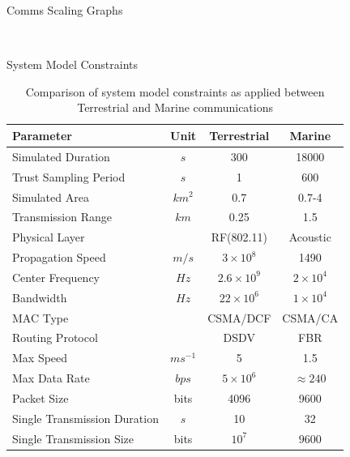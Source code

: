 \documentclass{beamer}
\begin{document}
\begin{frame}[allowframebreaks]{Comms Scaling Graphs}

\setcounter{subfigure}{0}%
  \begin{figure}[h]
    \centering
    \\
    \label{fig:CommsThroughputRatios}
  \end{figure}

\end{frame}

\begin{frame}[shrink]{System Model Constraints}
\centering
\begin{table}[h]
  \caption{Comparison of system model constraints as applied between Terrestrial and Marine communications} \label{tab:sysconstraints}
  \begin{center}
    \setlength{\tabcolsep}{8pt}
    \begin{tabular}{lccc}
      \toprule
      Parameter & Unit & Terrestrial & Marine \\
      \midrule
      Simulated Duration & $s$ & 300 & 18000\\
      Trust Sampling Period & $s$ & 1 & 600 \\
      Simulated Area & $km^2$ & 0.7 & 0.7-4 \\
      Transmission Range & $km$ & 0.25 & 1.5 \\
      Physical Layer & & RF(802.11) & Acoustic\\
      Propagation Speed& $m/s$ & $3\times10^8$ & 1490\\
      Center Frequency& $Hz$ & $2.6\times10^9$ & $2 \times 10^4$ \\
      Bandwidth& $Hz$ & $22\times10^6$ & $1\times10^4$\\
      MAC Type & & CSMA/DCF & CSMA/CA\\
      Routing Protocol & & DSDV & FBR \\
      Max Speed & $ms^{-1}$ & 5 & 1.5 \\
      Max Data Rate & $bps$ & $5\times10^6$ & $\approx 240$ \\
      Packet Size & bits & 4096 &  9600 \\
      Single Transmission Duration & $s$ & 10 & 32 \\
      Single Transmission Size & bits & $10^7$ & $9600$ \\
      \bottomrule
    \end{tabular}
    \setlength{\tabcolsep}{6pt}
  \end{center}
\end{table}

\end{frame}
\end{document}
